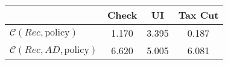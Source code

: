 \begin{tabular}{@{}lccc@{}} 
\toprule 
                          & Check      & UI    & Tax Cut    \\  \midrule 
$\mathcal{C}(Rec,\text{policy})$ & 1.170  & 3.395  & 0.187     \\ 
$\mathcal{C}(Rec, AD,\text{policy})$ & 6.620  & 5.005  & 6.081     \\ 
\end{tabular}  
